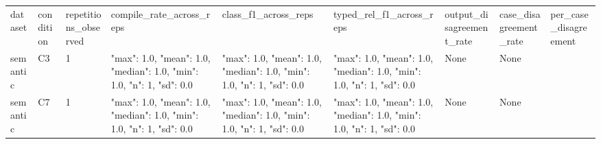 \begin{tabular}{lllllllll}
dataset & condition & repetitions\_observed & compile\_rate\_across\_reps & class\_f1\_across\_reps & typed\_rel\_f1\_across\_reps & output\_disagreement\_rate & case\_disagreement\_rate & per\_case\_disagreement \\
semantic & C3 & 1 & {"max": 1.0, "mean": 1.0, "median": 1.0, "min": 1.0, "n": 1, "sd": 0.0} & {"max": 1.0, "mean": 1.0, "median": 1.0, "min": 1.0, "n": 1, "sd": 0.0} & {"max": 1.0, "mean": 1.0, "median": 1.0, "min": 1.0, "n": 1, "sd": 0.0} & None & None & {} \\
semantic & C7 & 1 & {"max": 1.0, "mean": 1.0, "median": 1.0, "min": 1.0, "n": 1, "sd": 0.0} & {"max": 1.0, "mean": 1.0, "median": 1.0, "min": 1.0, "n": 1, "sd": 0.0} & {"max": 1.0, "mean": 1.0, "median": 1.0, "min": 1.0, "n": 1, "sd": 0.0} & None & None & {} \\
\end{tabular}